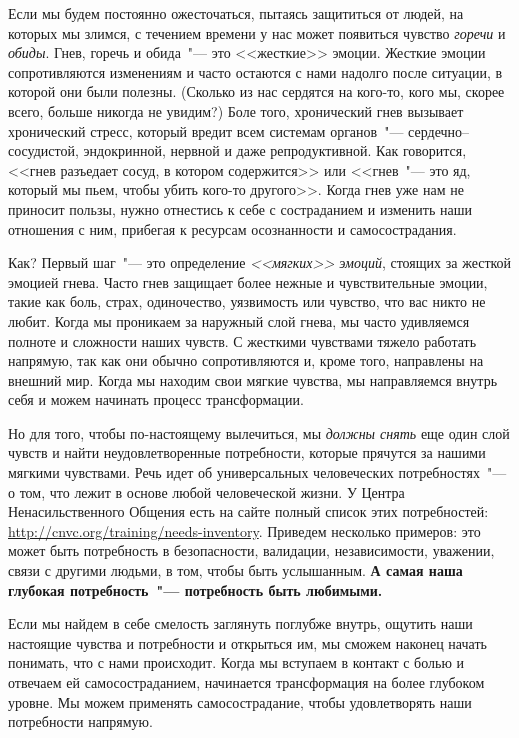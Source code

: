 Если мы будем постоянно ожесточаться, пытаясь защититься от людей, на которых мы злимся, с течением времени у нас может появиться чувство \emph{горечи} и \emph{обиды}. Гнев, горечь и обида~"--- это <<жесткие>> эмоции\cite{109}. Жесткие эмоции сопротивляются изменениям и часто остаются с нами надолго после ситуации, в которой они были полезны. (Сколько из нас сердятся на кого-то, кого мы, скорее всего, больше никогда не увидим?) Боле того, хронический гнев вызывает хронический стресс, который вредит всем системам органов~"--- сердечно--сосудистой, эндокринной, нервной и даже репродуктивной\cite{110}. Как говорится, <<гнев разъедает сосуд, в котором содержится>> или <<гнев~"--- это яд, который мы пьем, чтобы убить кого-то другого>>. Когда гнев уже нам не приносит пользы, нужно отнестись к себе с состраданием и изменить наши отношения с ним, прибегая к ресурсам осознанности и самосострадания.

Как? Первый шаг~"--- это определение \emph{<<мягких>> эмоций}, стоящих за жесткой эмоцией гнева. Часто гнев защищает более нежные и чувствительные эмоции, такие как боль, страх, одиночество, уязвимость или чувство, что вас никто не любит. Когда мы проникаем за наружный слой гнева, мы часто удивляемся полноте и сложности наших чувств. С жесткими чувствами тяжело работать напрямую, так как они обычно сопротивляются и, кроме того, направлены на внешний мир. Когда мы находим свои мягкие чувства, мы направляемся внутрь себя и можем начинать процесс трансформации.

Но для того, чтобы по-настоящему вылечиться, мы \emph{должны снять} еще один слой чувств и найти неудовлетворенные потребности, которые прячутся за нашими мягкими чувствами. Речь идет об универсальных человеческих потребностях~"--- о том, что лежит в основе любой человеческой жизни\cite{111}. У Центра Ненасильственного Общения есть на сайте полный список этих потребностей: \url{http://cnvc.org/training/needs-inventory}. Приведем несколько примеров: это может быть потребность в безопасности, валидации, независимости, уважении, связи с другими людьми, в том, чтобы быть услышанным. \textbf{А самая наша глубокая потребность~"--- потребность быть любимыми.}

Если мы найдем в себе смелость заглянуть поглубже внутрь, ощутить наши настоящие чувства и потребности и открыться им, мы сможем наконец начать понимать, что с нами происходит. Когда мы вступаем в контакт с болью и отвечаем ей самосостраданием, начинается трансформация на более глубоком уровне. Мы можем применять самосострадание, чтобы удовлетворять наши потребности напрямую. 

